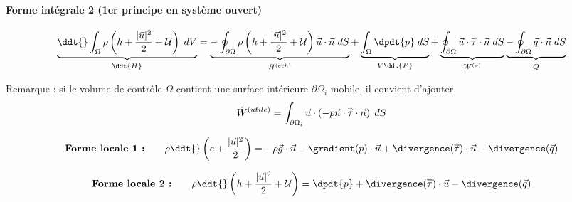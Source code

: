 \paragraph{Forme intégrale 2 (1er principe en système ouvert)}
\begin{equation}
		\underbrace{
		\ddt{} \int_{\Omega} \rho \left( h + \frac{ |\vec{u}|^2}{2} + {\cal U} \right) \; dV
		 }_{\ddt{H} }	
		= \underbrace{-  \oint_{\partial \Omega}  \rho \left( h + \frac{ |\vec{u}|^2}{2} + {\cal U} \right) \vec{u} \cdot \vec{n} \; dS
		}_{\dot{H}^{(ech)}} 
		+ \underbrace{ \int _{\Omega} \dpdt{p}\; dS
		}_{ V \ddt{P}  } 
		+ \underbrace{ \oint_{\partial \Omega} \vec{u} \cdot \mytensor{\tau} \cdot \vec{n}   \; dS 
		}_{\dot{W}^{(v)}} 
		 \underbrace{ - \oint_{\partial \Omega} \vec{q} \cdot \vec{n} \; dS
		}_{\dot{Q}} 
		\label{eq:bilan_global_eulerien_e2}
\end{equation}

Remarque : si le volume de contrôle ${\Omega}$ contient une surface intérieure ${\partial \Omega}_i$ mobile,
il convient d'ajouter
$$
\dot{W}^{(utile)} = \int_{{\partial \Omega}_i}  \vec{u} \cdot \left( -p \vec{n}  \cdot  \accentset{\Rightarrow}{\tau} \cdot \vec{n} \right)  \; dS
$$ 





\begin{equation}
\mbox{\bf Forme locale 1 :} \qquad 
		\rho \ddt{} \left( e+ \frac{|\vec{u}|^2}{2} \right) 
		= -\rho \vec{g} \cdot \vec{u} 
		- \gradient ( p) \cdot  \vec{u}  
		+ \divergence ( \mytensor{\tau}) \cdot \vec{u}  
		 - \divergence(\vec{q})
\end{equation}



\begin{equation}
\mbox{\bf Forme locale 2 :} \qquad 
		\rho \ddt{} \left( h + \frac{|\vec{u}|^2}{2} + {\cal U} \right) 
		=
		 \dpdt{p}
		+ \divergence ( \mytensor{\tau}) \cdot \vec{u}  
		 - \divergence(\vec{q})
\end{equation}


